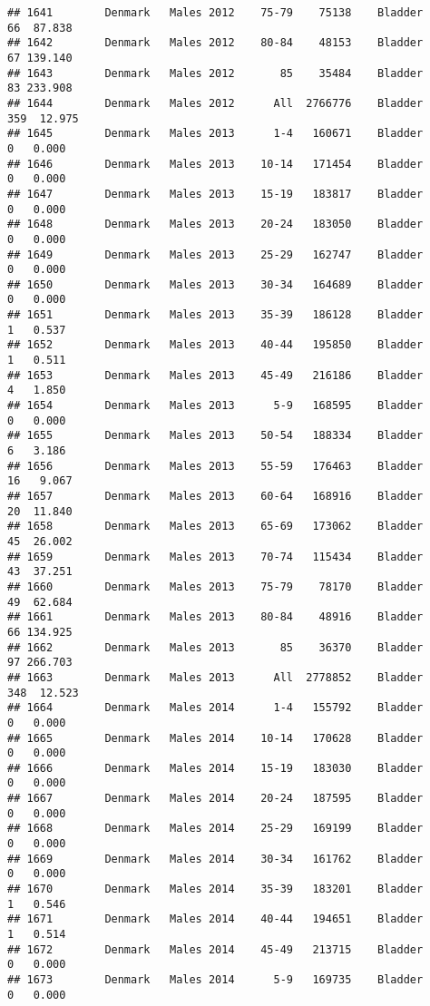 \documentclass[
]{article}
\begin{document}
\begin{verbatim}
## 1641        Denmark   Males 2012    75-79    75138    Bladder     66  87.838
## 1642        Denmark   Males 2012    80-84    48153    Bladder     67 139.140
## 1643        Denmark   Males 2012       85    35484    Bladder     83 233.908
## 1644        Denmark   Males 2012      All  2766776    Bladder    359  12.975
## 1645        Denmark   Males 2013      1-4   160671    Bladder      0   0.000
## 1646        Denmark   Males 2013    10-14   171454    Bladder      0   0.000
## 1647        Denmark   Males 2013    15-19   183817    Bladder      0   0.000
## 1648        Denmark   Males 2013    20-24   183050    Bladder      0   0.000
## 1649        Denmark   Males 2013    25-29   162747    Bladder      0   0.000
## 1650        Denmark   Males 2013    30-34   164689    Bladder      0   0.000
## 1651        Denmark   Males 2013    35-39   186128    Bladder      1   0.537
## 1652        Denmark   Males 2013    40-44   195850    Bladder      1   0.511
## 1653        Denmark   Males 2013    45-49   216186    Bladder      4   1.850
## 1654        Denmark   Males 2013      5-9   168595    Bladder      0   0.000
## 1655        Denmark   Males 2013    50-54   188334    Bladder      6   3.186
## 1656        Denmark   Males 2013    55-59   176463    Bladder     16   9.067
## 1657        Denmark   Males 2013    60-64   168916    Bladder     20  11.840
## 1658        Denmark   Males 2013    65-69   173062    Bladder     45  26.002
## 1659        Denmark   Males 2013    70-74   115434    Bladder     43  37.251
## 1660        Denmark   Males 2013    75-79    78170    Bladder     49  62.684
## 1661        Denmark   Males 2013    80-84    48916    Bladder     66 134.925
## 1662        Denmark   Males 2013       85    36370    Bladder     97 266.703
## 1663        Denmark   Males 2013      All  2778852    Bladder    348  12.523
## 1664        Denmark   Males 2014      1-4   155792    Bladder      0   0.000
## 1665        Denmark   Males 2014    10-14   170628    Bladder      0   0.000
## 1666        Denmark   Males 2014    15-19   183030    Bladder      0   0.000
## 1667        Denmark   Males 2014    20-24   187595    Bladder      0   0.000
## 1668        Denmark   Males 2014    25-29   169199    Bladder      0   0.000
## 1669        Denmark   Males 2014    30-34   161762    Bladder      0   0.000
## 1670        Denmark   Males 2014    35-39   183201    Bladder      1   0.546
## 1671        Denmark   Males 2014    40-44   194651    Bladder      1   0.514
## 1672        Denmark   Males 2014    45-49   213715    Bladder      0   0.000
## 1673        Denmark   Males 2014      5-9   169735    Bladder      0   0.000

\end{verbatim}
\end{document}
